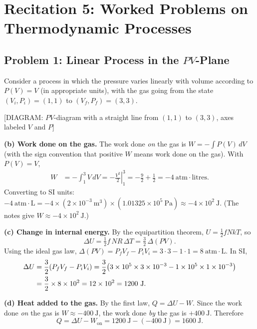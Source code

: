 \section{Recitation 5: Worked Problems on Thermodynamic Processes}

\subsection{Problem 1: Linear Process in the $PV$-Plane}

Consider a process in which the pressure varies linearly with volume according to $P(V) = V$ (in appropriate units), with the gas going from the state $(V_i, P_i) = (1, 1)$ to $(V_f, P_f) = (3, 3)$.

\begin{center}[DIAGRAM: $PV$-diagram with a straight line from $(1,1)$ to $(3,3)$, axes labeled $V$ and $P$]\end{center}

\textbf{(b) Work done on the gas.}
The work done \emph{on} the gas is $W = -\int P(V)\,dV$ (with the sign convention that positive $W$ means work done on the gas). With $P(V) = V$,
\begin{align}
    W &= -\int_1^3 V\,dV = -\left.\frac{V^2}{2}\right|_1^3 = -\frac{9}{2} + \frac{1}{2} = -4\ \text{atm}\cdot\text{litres}.
\end{align}
Converting to SI units: $-4\ \text{atm}\cdot\text{L} = -4 \times (2\times 10^{-3}\ \text{m}^3) \times (1.01325\times 10^5\ \text{Pa}) \approx -4\times 10^2\ \text{J}$. (The notes give $W \approx -4\times 10^2\ \text{J}$.)

\textbf{(c) Change in internal energy.}
By the equipartition theorem, $U = \tfrac{1}{2}f N k T$, so
\begin{equation}
    \Delta U = \tfrac{1}{2}f\,NR\,\Delta T = \tfrac{3}{2}\,\Delta(PV).
\end{equation}
Using the ideal gas law, $\Delta(PV) = P_f V_f - P_i V_i = 3\cdot 3 - 1\cdot 1 = 8\ \text{atm}\cdot\text{L}$. In SI,
\begin{align}
    \Delta U &= \frac{3}{2}(P_f V_f - P_i V_i) = \frac{3}{2}\bigl(3\times 10^5 \times 3\times 10^{-3} - 1\times 10^5 \times 1\times 10^{-3}\bigr) \notag \\
             &= \frac{3}{2}\times 8\times 10^2 = 12\times 10^2 = 1200\ \text{J}.
\end{align}

\textbf{(d) Heat added to the gas.}
By the first law, $Q = \Delta U - W$. Since the work done \emph{on} the gas is $W \approx -400\ \text{J}$, the work done \emph{by} the gas is $+400\ \text{J}$. Therefore
\begin{equation}
    Q = \Delta U - W_{\text{on}} = 1200\ \text{J} - (-400\ \text{J}) = 1600\ \text{J}.
\end{equation}

